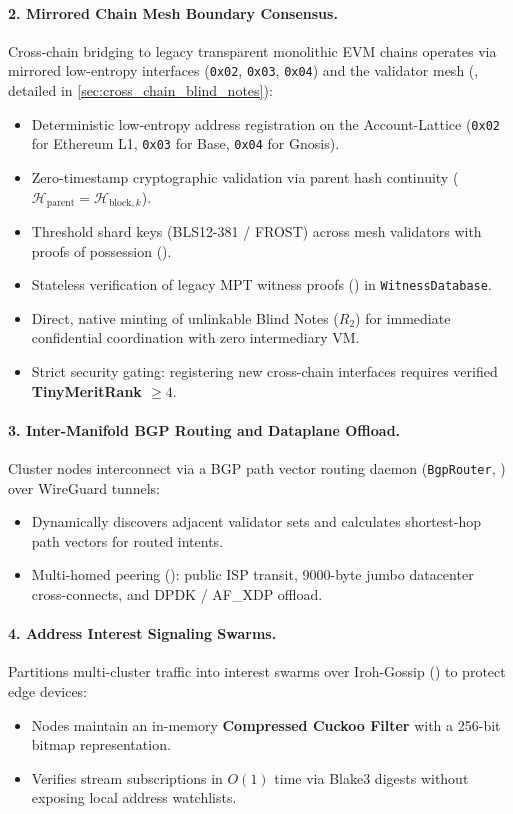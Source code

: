 \documentclass[a4paper,11pt,twoside,parskip=half-,headings=small]{scrartcl}
\newcommand{\code}[1]{\texttt{#1}}
\begin{document}
\paragraph{2. Mirrored Chain Mesh Boundary Consensus.}
Cross-chain bridging to legacy transparent monolithic EVM chains operates via mirrored low-entropy interfaces (\code{0x02}, \code{0x03}, \code{0x04}) and the validator mesh (, detailed in \cref{sec:cross_chain_blind_notes}):
\begin{itemize}[nosep]
  \item Deterministic low-entropy address registration on the Account-Lattice (\code{0x02} for Ethereum L1, \code{0x03} for Base, \code{0x04} for Gnosis).
  \item Zero-timestamp cryptographic validation via parent hash continuity ($\mathcal{H}_{\text{parent}} = \mathcal{H}_{\text{block}, k}$).
  \item Threshold shard keys (BLS12-381 / FROST) across mesh validators with proofs of possession ().
  \item Stateless verification of legacy MPT witness proofs () in \code{WitnessDatabase}.
  \item Direct, native minting of unlinkable Blind Notes ($R_2$) for immediate confidential coordination with zero intermediary VM.
  \item Strict security gating: registering new cross-chain interfaces requires verified \textbf{TinyMeritRank $\ge 4$}.
\end{itemize}

\paragraph{3. Inter-Manifold BGP Routing and Dataplane Offload.}
Cluster nodes interconnect via a BGP path vector routing daemon (\code{BgpRouter}, ) over WireGuard tunnels:
\begin{itemize}[nosep]
  \item Dynamically discovers adjacent validator sets and calculates shortest-hop path vectors for routed intents.
  \item Multi-homed peering (): public ISP transit, 9000-byte jumbo datacenter cross-connects, and DPDK / AF\_XDP offload.
\end{itemize}

\paragraph{4. Address Interest Signaling Swarms.}
Partitions multi-cluster traffic into interest swarms over Iroh-Gossip () to protect edge devices:
\begin{itemize}[nosep]
  \item Nodes maintain an in-memory \textbf{Compressed Cuckoo Filter} with a 256-bit bitmap representation.
  \item Verifies stream subscriptions in $O(1)$ time via Blake3 digests without exposing local address watchlists.
\end{itemize}
\end{document}
